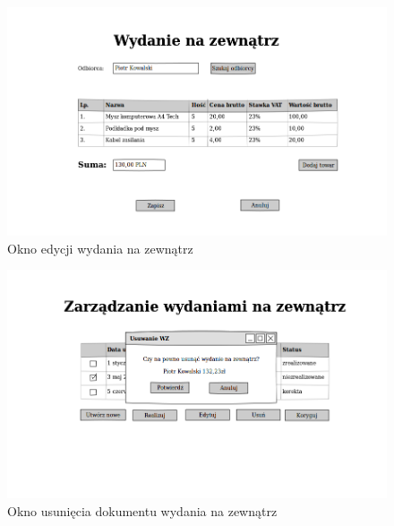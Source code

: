 \begin{figure}[!htb]
  \begin{center}
    \includegraphics[scale=0.45]{../img/interfejs/edycja-wydania-na-zewnatrz.png}
  \end{center}
  \caption{Okno edycji wydania na zewnątrz}
\end{figure}
\FloatBarrier

\begin{figure}[!htb]
  \begin{center}
    \includegraphics[scale=0.45]{../img/interfejs/usuniecie-wydania-na-zewnatrz.png}
  \end{center}
  \caption{Okno usunięcia dokumentu wydania na zewnątrz}
\end{figure}
\FloatBarrier

